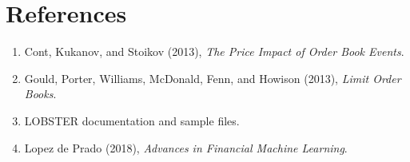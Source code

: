 \documentclass[11pt]{article}
\newcommand{\answerlines}[1]{\vspace{#1\baselineskip}}
\begin{document}
\answerlines{6}

\section*{References}

\begin{enumerate}
  \item Cont, Kukanov, and Stoikov (2013), \textit{The Price Impact of Order Book Events}.
  \item Gould, Porter, Williams, McDonald, Fenn, and Howison (2013), \textit{Limit Order Books}.
  \item LOBSTER documentation and sample files.
  \item Lopez de Prado (2018), \textit{Advances in Financial Machine Learning}.
\end{enumerate}
\end{document}
